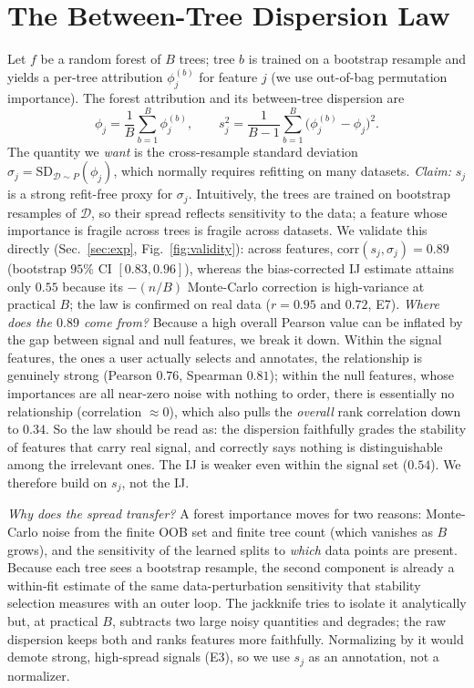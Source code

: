 \documentclass[conference]{IEEEtran}
\begin{document}
\section{The Between-Tree Dispersion Law}\label{sec:validity}
Let $f$ be a random forest of $B$ trees; tree $b$ is trained on a bootstrap
resample and yields a per-tree attribution $\phi_j^{(b)}$ for feature $j$
(we use out-of-bag permutation importance). The forest attribution and its
between-tree dispersion are
\begin{equation}
\phi_j=\frac1B\sum_{b=1}^B \phi_j^{(b)},\qquad
s_j^2=\frac{1}{B-1}\sum_{b=1}^B\big(\phi_j^{(b)}-\phi_j\big)^2 .
\end{equation}
The quantity we \emph{want} is the cross-resample standard deviation
$\sigma_j=\mathrm{SD}_{\mathcal{D}\sim P}(\phi_j)$, which normally requires
refitting on many datasets. \emph{Claim:} $s_j$ is a strong refit-free proxy
for $\sigma_j$. Intuitively, the trees are trained on bootstrap resamples of
$\mathcal{D}$, so their spread reflects sensitivity to the data; a feature whose
importance is fragile across trees is fragile across datasets. We validate this
directly (Sec.~\ref{sec:exp}, Fig.~\ref{fig:validity}): across features,
$\mathrm{corr}(s_j,\sigma_j)=0.89$ (bootstrap $95\%$ CI $[0.83,0.96]$), whereas
the bias-corrected IJ estimate attains only $0.55$ because its $-(n/B)$
Monte-Carlo correction is high-variance at practical $B$; the law is confirmed on
real data ($r{=}0.95$ and $0.72$, E7). \emph{Where does the $0.89$ come from?}
Because a high overall Pearson value can be inflated by the gap between signal
and null features, we break it down. Within the signal features, the ones a
user actually selects and annotates, the relationship is genuinely strong
(Pearson $0.76$, Spearman $0.81$); within the null features, whose importances
are all near-zero noise with nothing to order, there is essentially no
relationship (correlation $\approx 0$), which also pulls the \emph{overall}
rank correlation down to $0.34$. So the law should be read as: the dispersion
faithfully grades the stability of features that carry real signal, and
correctly says nothing is distinguishable among the irrelevant ones. The IJ is
weaker even within the signal set ($0.54$). We therefore build on $s_j$, not the
IJ.

\emph{Why does the spread transfer?} A forest importance moves for two reasons:
Monte-Carlo noise from the finite OOB set and finite tree count (which vanishes
as $B$ grows), and the sensitivity of the learned splits to \emph{which} data
points are present. Because each tree sees a bootstrap resample, the second
component is already a within-fit estimate of the same data-perturbation
sensitivity that stability selection measures with an outer loop. The jackknife
tries to isolate it analytically but, at practical $B$, subtracts two large noisy
quantities and degrades; the raw dispersion keeps both and ranks features more
faithfully. Normalizing by it would demote strong, high-spread signals (E3), so
we use $s_j$ as an annotation, not a normalizer.
\end{document}
